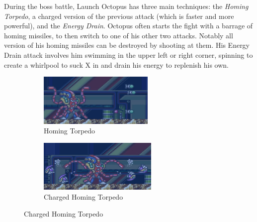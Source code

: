 During the boss battle, Launch Octopus has three main techniques: the \emph{Homing Torpedo}, a charged version of the previous attack (which is faster and more powerful), and the \emph{Energy Drain}.  Octopus often starts the fight with a barrage of homing missiles, to then switch to one of his other two attacks. Notably all version of his homing missiles can be destroyed by shooting at them. His Energy Drain attack involves him swimming in the upper left or right corner, spinning to create a whirlpool to suck X in and drain his energy to replenish his own.
\begin{figure}[htp]
	\centering
	\begin{subfigure}{0.48\textwidth}
		\centering
		\includegraphics[height=2.5cm]{figures/X1/Launch_octopus/Octopus_missile.jpg}
		\caption{Homing Torpedo}
	\end{subfigure}
	\begin{subfigure}{0.48\textwidth}
		\centering
		\includegraphics[height=2.5cm]{figures/X1/Launch_octopus/Octopus_piranha.jpg}
		\caption{Charged Homing Torpedo}
	\end{subfigure}


\end{figure}
